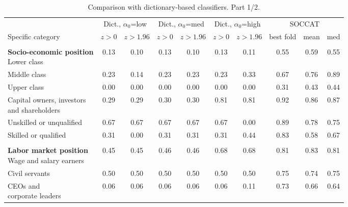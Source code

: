 \begin{table}[htb]
\centering
\renewcommand{\arraystretch}{0.9}
\scriptsize
\begin{threeparttable}
\caption{Comparison with dictionary-based classifiers. Part 1/2.}
\label{tab:dictionary_alpha0_sweep_part1}
\begin{tabular}{l c c c c c c c c c}
\toprule
 & \multicolumn{2}{c}{Dict., $\alpha_0$=low} & \multicolumn{2}{c}{Dict., $\alpha_0$=med} & \multicolumn{2}{c}{Dict., $\alpha_0$=high} & \multicolumn{3}{c}{SOCCAT} \\
\cmidrule(lr){2-3} \cmidrule(lr){4-5} \cmidrule(lr){6-7} \cmidrule(lr){8-10}
Specific category & \multicolumn{1}{c}{$z>0$} & \multicolumn{1}{c}{$z>1.96$} & \multicolumn{1}{c}{$z>0$} & \multicolumn{1}{c}{$z>1.96$} & \multicolumn{1}{c}{$z>0$} & \multicolumn{1}{c}{$z>1.96$} & \multicolumn{1}{c}{best fold} & \multicolumn{1}{c}{mean} & \multicolumn{1}{c}{med} \\
\midrule
\rule{0pt}{5pt} &  &  &  &  &  &  &  &  &  \\
\shortstack[l]{\textbf{Socio-economic position}\\[3pt]Lower class} & 0.13 & 0.10 & 0.13 & 0.10 & 0.13 & 0.11 & 0.55 & 0.59 & 0.55 \\
Middle class & 0.23 & 0.14 & 0.23 & 0.23 & 0.23 & 0.33 & 0.67 & 0.76 & 0.89 \\
Upper class & 0.00 & 0.00 & 0.00 & 0.00 & 0.00 & 0.00 & 0.31 & 0.43 & 0.44 \\
\shortstack[l]{Capital owners, investors\\[-3pt]and shareholders} & 0.29 & 0.29 & 0.30 & 0.30 & 0.81 & 0.81 & 0.92 & 0.86 & 0.87 \\
Unskilled or unqualified & 0.67 & 0.67 & 0.67 & 0.67 & 0.67 & 0.00 & 0.89 & 0.78 & 0.75 \\
Skilled or qualified & 0.31 & 0.00 & 0.31 & 0.31 & 0.31 & 0.44 & 0.83 & 0.58 & 0.67 \\
\rule{0pt}{5pt} &  &  &  &  &  &  &  &  &  \\
\shortstack[l]{\textbf{Labor market position}\\[3pt]Wage and salary earners} & 0.45 & 0.45 & 0.46 & 0.46 & 0.68 & 0.68 & 0.81 & 0.83 & 0.81 \\
Civil servants & 0.50 & 0.50 & 0.50 & 0.50 & 0.50 & 0.50 & 0.75 & 0.74 & 0.75 \\
\shortstack[l]{CEOs and\\[-3pt]corporate leaders} & 0.06 & 0.06 & 0.06 & 0.06 & 0.06 & 0.11 & 0.73 & 0.66 & 0.64 \\

\end{tabular}
\end{threeparttable}
\end{table}
